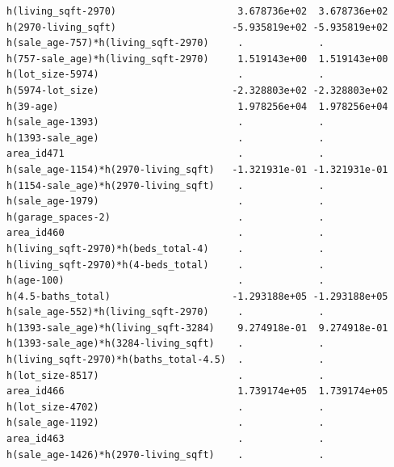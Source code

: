 \documentclass[
]{article}
\begin{document}
\begin{verbatim}
h(living_sqft-2970)                     3.678736e+02  3.678736e+02
h(2970-living_sqft)                    -5.935819e+02 -5.935819e+02
h(sale_age-757)*h(living_sqft-2970)     .             .           
h(757-sale_age)*h(living_sqft-2970)     1.519143e+00  1.519143e+00
h(lot_size-5974)                        .             .           
h(5974-lot_size)                       -2.328803e+02 -2.328803e+02
h(39-age)                               1.978256e+04  1.978256e+04
h(sale_age-1393)                        .             .           
h(1393-sale_age)                        .             .           
area_id471                              .             .           
h(sale_age-1154)*h(2970-living_sqft)   -1.321931e-01 -1.321931e-01
h(1154-sale_age)*h(2970-living_sqft)    .             .           
h(sale_age-1979)                        .             .           
h(garage_spaces-2)                      .             .           
area_id460                              .             .           
h(living_sqft-2970)*h(beds_total-4)     .             .           
h(living_sqft-2970)*h(4-beds_total)     .             .           
h(age-100)                              .             .           
h(4.5-baths_total)                     -1.293188e+05 -1.293188e+05
h(sale_age-552)*h(living_sqft-2970)     .             .           
h(1393-sale_age)*h(living_sqft-3284)    9.274918e-01  9.274918e-01
h(1393-sale_age)*h(3284-living_sqft)    .             .           
h(living_sqft-2970)*h(baths_total-4.5)  .             .           
h(lot_size-8517)                        .             .           
area_id466                              1.739174e+05  1.739174e+05
h(lot_size-4702)                        .             .           
h(sale_age-1192)                        .             .           
area_id463                              .             .           
h(sale_age-1426)*h(2970-living_sqft)    .             .           
                                                                  

\end{verbatim}
\end{document}
